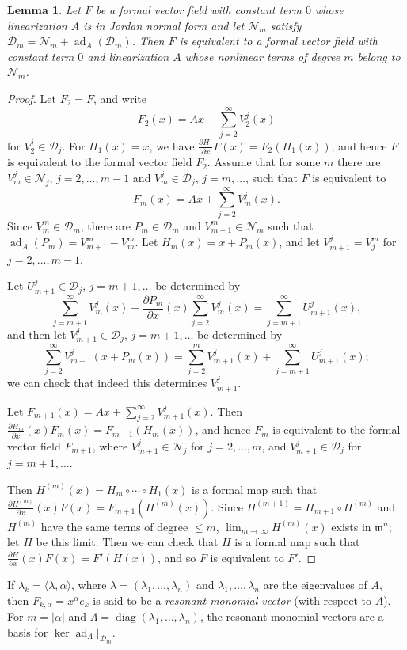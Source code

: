 \documentclass{article}
\newtheorem{lemma}[theorem]{Lemma}
\newcommand{\diag}{\operatorname{diag}}
\newcommand{\ad}{\operatorname{ad}}
\begin{document}
\begin{lemma}
\label{paradigm}
Let $F$ be a formal vector field with constant term $0$ whose linearization $A$ is in Jordan normal form
and let $\mathscr{N}_m$ satisfy 
$\mathscr{D}_m=\mathscr{N}_m + \ad_A(\mathscr{D}_m)$. Then $F$ is equivalent to a formal vector
field with constant term $0$ and linearization $A$ whose  nonlinear terms of degree $m$ belong to $\mathscr{N}_m$.
\end{lemma}
\begin{proof}
Let $F_2=F$, and write
\[
F_2(x)=Ax+\sum_{j=2}^\infty V^j_2(x)
\]
for $V^j_2 \in \mathscr{D}_j$. For $H_1(x)=x$, we have $\frac{\partial H_1}{\partial x}F(x)=
F_2(H_1(x))$, and hence $F$ is equivalent to the formal vector field $F_2$. Assume that for some $m$ there are $V^j_m \in \mathscr{N}_j$, $j=2,
\dots,m-1$ and $V^j_m \in \mathscr{D}_j$, $j=m,\ldots$, such that $F$ is equivalent to
\[
F_m(x)=Ax+\sum_{j=2}^\infty V^j_m(x).
\]
Since $V_m^m \in \mathscr{D}_m$, there are $P_m \in \mathscr{D}_m$ and $V^m_{m+1} \in
\mathscr{N}_m$ such that $\ad_A(P_m)=V^m_{m+1}-V_m^m$. Let $H_m(x)=x+P_m(x)$, and let
$V^j_{m+1}=V_j^m$ for $j=2,\ldots,m-1$.

Let $U^j_{m+1} \in \mathscr{D}_j$, $j=m+1,\ldots$ be determined by
\[
\sum_{j=m+1}^\infty V^j_m(x) + \frac{\partial P_m}{\partial x}(x)\sum_{j=2}^\infty V^j_m(x)
=\sum_{j=m+1}^\infty U^j_{m+1}(x),
\]
and then let $V^j_{m+1} \in \mathscr{D}_j$, $j=m+1,\ldots$ be determined by
\[
\sum_{j=2}^\infty V^j_{m+1}(x+P_m(x))=\sum_{j=2}^m V^j_{m+1}(x)
+ \sum_{j=m+1}^\infty U^j_{m+1}(x);
\]
we can check that indeed this determines $V^j_{m+1}$.

Let $F_{m+1}(x)=Ax+\sum_{j=2}^\infty V^j_{m+1}(x)$. Then
$\frac{\partial H_m}{\partial x}(x)F_m(x)=F_{m+1}(H_m(x))$, and hence $F_m$ is equivalent to the formal vector field $F_{m+1}$, where $V^j_{m+1} \in \mathscr{N}_j$ for $j=2,\ldots,m$, and $V^j_{m+1} \in \mathscr{D}_j$
for $j=m+1,\ldots$. 

Then 
$H^{(m)}(x)=H_m \circ \cdots \circ H_1(x)$ is a formal map such that
$\frac{\partial H^{(m)}}{\partial x}(x) F(x)=F_{m+1}(H^{(m)}(x))$.
Since $H^{(m+1)}=H_{m+1} \circ H^{(m)}$ and $H^{(m)}$ have the same terms of
degree $\leq m$,  $\lim_{m \to \infty} H^{(m)}(x)$ exists in $\mathfrak{m}^n$; let $H$ be this limit. Then
we can check that $H$ is a formal map such that 
$\frac{\partial H}{\partial x}(x) F(x)=F'(H(x))$, and so
$F$ is equivalent to $F'$.
\end{proof}

If $\lambda_k=\langle \lambda,\alpha \rangle$, where $\lambda=(\lambda_1,\ldots,\lambda_n)$ and $\lambda_1,\ldots,\lambda_n$ are the eigenvalues of $A$, then
 $F_{k,\alpha}=x^\alpha e_k$ is said to be a {\em resonant monomial vector} (with respect to $A$). For $m=|\alpha|$
 and $\Lambda=\diag(\lambda_1,\ldots,\lambda_n)$, the resonant monomial vectors are a basis for $\ker \ad_\Lambda|_{\mathscr{D}_m}$.
 
\end{document}
